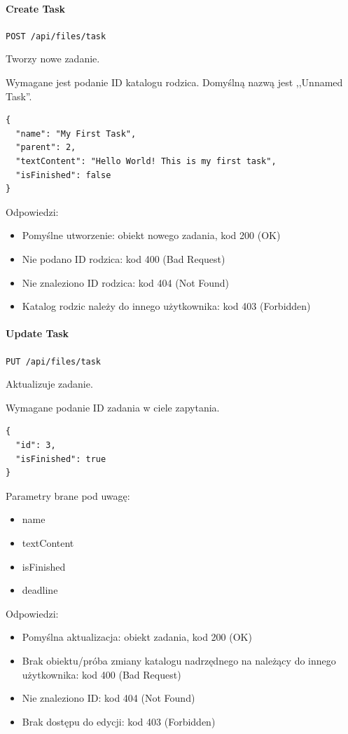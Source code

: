 \documentclass[a4paper,twoside,12pt]{book}
\begin{document}
\paragraph{Create Task}

\texttt{POST /api/files/task}

Tworzy nowe zadanie.

Wymagane jest podanie ID katalogu rodzica. Domyślną nazwą jest ,,Unnamed Task''.

\begin{verbatim}
{
  "name": "My First Task",
  "parent": 2,
  "textContent": "Hello World! This is my first task",
  "isFinished": false
}
\end{verbatim}

Odpowiedzi: 
\begin{itemize}
	\item Pomyślne utworzenie: obiekt nowego zadania, kod 200 (OK) 
	\item Nie podano ID rodzica: kod 400 (Bad Request)
	\item Nie znaleziono ID rodzica: kod 404 (Not Found) 
	\item Katalog rodzic należy do innego użytkownika: kod 403 (Forbidden)
\end{itemize}

\paragraph{Update Task}

\texttt{PUT /api/files/task}

Aktualizuje zadanie.

Wymagane podanie ID zadania w ciele zapytania.

\begin{verbatim}
{
  "id": 3,
  "isFinished": true
}
\end{verbatim}

Parametry brane pod uwagę: 
\begin{itemize}
	\item  name \item  textContent \item  isFinished \item  deadline
\end{itemize}

Odpowiedzi: 
\begin{itemize}
	\item Pomyślna aktualizacja: obiekt zadania, kod 200 (OK) 
	\item Brak obiektu/próba zmiany katalogu nadrzędnego na należący do innego użytkownika: kod 400 (Bad Request) 
	\item Nie znaleziono ID: kod 404 (Not Found)
	\item Brak dostępu do edycji: kod 403 (Forbidden)
\end{itemize}
\end{document}
